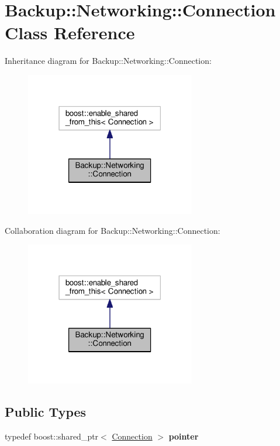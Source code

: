 \hypertarget{class_backup_1_1_networking_1_1_connection}{}\section{Backup\+:\+:Networking\+:\+:Connection Class Reference}
\label{class_backup_1_1_networking_1_1_connection}


Inheritance diagram for Backup\+:\+:Networking\+:\+:Connection\+:
\nopagebreak
\begin{figure}[H]
\begin{center}
\leavevmode
\includegraphics[width=210pt]{class_backup_1_1_networking_1_1_connection__inherit__graph}
\end{center}
\end{figure}


Collaboration diagram for Backup\+:\+:Networking\+:\+:Connection\+:
\nopagebreak
\begin{figure}[H]
\begin{center}
\leavevmode
\includegraphics[width=210pt]{class_backup_1_1_networking_1_1_connection__coll__graph}
\end{center}
\end{figure}
\subsection*{Public Types}
\begin{DoxyCompactItemize}
\item 
\mbox{\label{class_backup_1_1_networking_1_1_connection_a1b8db8cdf6210b8fb81ef1d5ae2411ba}} 
typedef boost\+::shared\+\_\+ptr$<$ \hyperlink{class_backup_1_1_networking_1_1_connection}{Connection} $>$ {\bfseries pointer}
\end{DoxyCompactItemize}
